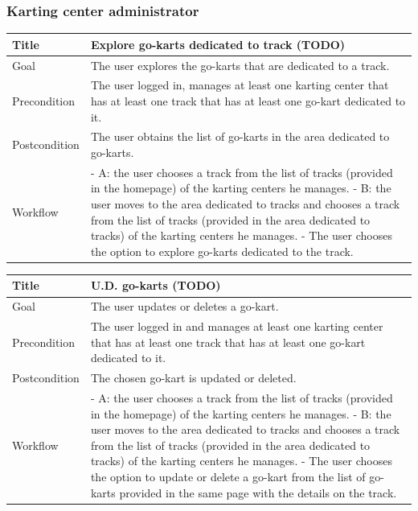 \documentclass{beamer}
\begin{document}
\begin{frame}
    \frametitle{Karting center administrator}
    \begin{table}
        \tiny
        \begin{tabular}{|p{2cm}|p{6cm}|}
        \hline  
        Title & \textbf{Explore go-karts dedicated to track (TODO)} \\
        \hline
        Goal & The user explores the go-karts that are dedicated to a track. \\
        \hline
        Precondition & The user logged in, manages at least one karting center that has at least
        one track that has at least one go-kart dedicated to it.\\
        \hline
        Postcondition & The user obtains the list of go-karts in the area dedicated to go-karts. \\
        \hline
        Workflow &
        - A: the user chooses a track from the list of tracks (provided in the homepage) 
        of the karting centers
        he manages. \newline
        - B: the user moves to the area dedicated to tracks and chooses a track from the list of tracks
        (provided in the area dedicated to tracks) of the karting centers he manages. \newline
        - The user chooses the option to explore go-karts dedicated to the track. \\
        \hline
        \end{tabular}
\end{table}

\begin{table}
    \tiny
    \begin{tabular}{|p{2cm}|p{6cm}|}
    \hline  
    Title & \textbf{U.D. go-karts (TODO)} \\
    \hline
    Goal & The user updates or deletes a go-kart. \\
    \hline
    Precondition & The user logged in and manages at least one karting center that has at least
    one track that has at least one go-kart dedicated to it. \\
    \hline
    Postcondition & The chosen go-kart is updated or deleted. \\
    \hline
    Workflow &
    - A: the user chooses a track from the list of tracks (provided in the homepage) 
    of the karting centers
    he manages. \newline
    - B: the user moves to the area dedicated to tracks and chooses a track from the list of tracks
    (provided in the area dedicated to tracks) of the karting centers he manages. \newline
    - The user chooses the option to update or delete a go-kart from the list of go-karts
    provided in the same page with the details on the track. \\
    \hline
    \end{tabular}
\end{table}

\end{frame}
\end{document}
